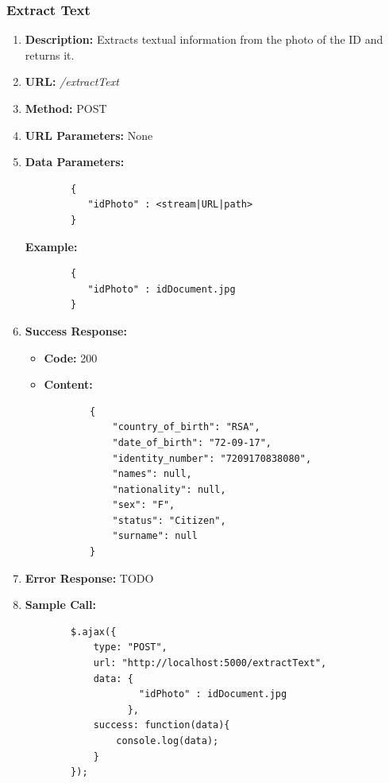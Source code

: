 \documentclass{article}
\begin{document}
        \subsubsection{Extract Text}
        \begin{enumerate}
        	\item \textbf{Description:} Extracts textual information from the photo of the ID and returns it.
        	\item \textbf{URL:} \textit{/extractText}
        	\item \textbf{Method:} POST
        	\item \textbf{URL Parameters:} None
        	\item \textbf{Data Parameters:}
        
        	\begin{lstlisting}
        {
           "idPhoto" : <stream|URL|path>
        }
        	\end{lstlisting}
        
        	\textbf{Example:}
        
        	\begin{lstlisting}
        {
           "idPhoto" : idDocument.jpg
        }
        	\end{lstlisting}
        	
        	\item \textbf{Success Response:} 
        		\begin{itemize}
        			\item \textbf{Code:} 200
        			\item \textbf{Content:}
        			\begin{lstlisting}
        {
            "country_of_birth": "RSA", 
            "date_of_birth": "72-09-17", 
            "identity_number": "7209170838080", 
            "names": null, 
            "nationality": null, 
            "sex": "F", 
            "status": "Citizen", 
            "surname": null
        }
        			\end{lstlisting}
        		\end{itemize}
        		\item \textbf{Error Response:} TODO
        		\item \textbf{Sample Call:}
        		\begin{lstlisting}
        $.ajax({
            type: "POST",
            url: "http://localhost:5000/extractText",
            data: {
                    "idPhoto" : idDocument.jpg
                  },
            success: function(data){
                console.log(data);
            }
        });
        		\end{lstlisting}
        \end{enumerate}
        
\end{document}
